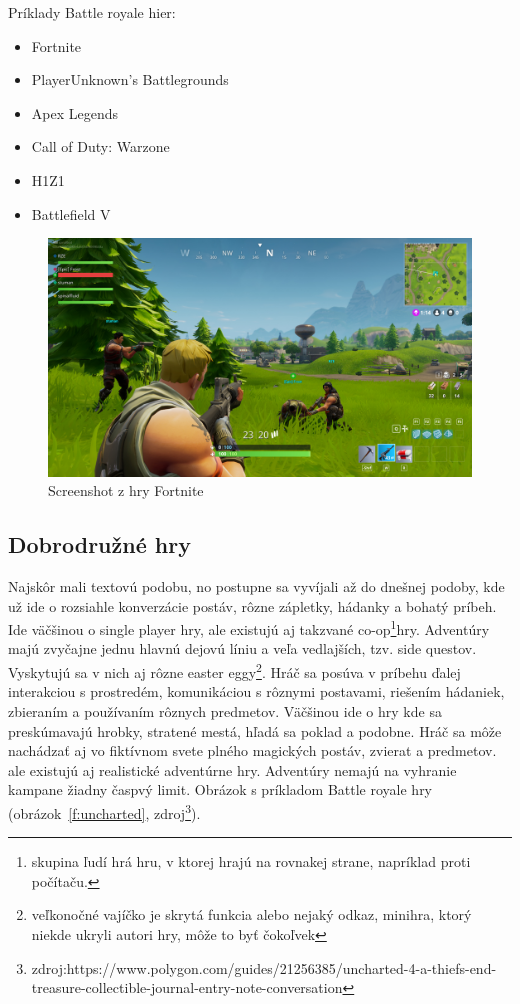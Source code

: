 \documentclass[10pt,oneside,slovak,a4paper]{article}
\begin{document}
Príklady Battle royale hier:
\begin{itemize}
\item Fortnite
\item PlayerUnknown's Battlegrounds
\item Apex Legends
\item Call of Duty: Warzone
\item H1Z1
\item Battlefield V
\end{itemize}

\begin{figure}[h]
\centering
\includegraphics[scale=0.10]{fortnite.jpg}
\caption{Screenshot z hry Fortnite}
\label{f:fortnite}
\end{figure}

\subsection{Dobrodružné hry} \label{zanre:adventure}

Najskôr mali textovú podobu, no postupne sa vyvíjali až do dnešnej podoby, kde už ide o rozsiahle konverzácie postáv, rôzne zápletky, hádanky a bohatý príbeh. Ide väčšinou o single player hry, ale existujú aj takzvané co-op\footnote{skupina ľudí hrá hru, v ktorej hrajú na rovnakej strane, napríklad proti počítaču.}hry. Adventúry majú zvyčajne jednu hlavnú dejovú líniu a veľa vedlajších, tzv. side questov. Vyskytujú sa v nich aj rôzne easter eggy\footnote{veľkonočné vajíčko je skrytá funkcia alebo nejaký odkaz, minihra, ktorý niekde ukryli autori hry, môže to byť čokoľvek }. Hráč sa posúva v príbehu ďalej interakciou s prostredém, komunikáciou s rôznymi postavami, riešením hádaniek, zbieraním a používaním rôznych predmetov. Väčšinou ide o hry kde sa preskúmavajú hrobky, stratené mestá, hľadá sa poklad a podobne. Hráč sa môže nachádzať aj vo fiktívnom svete plného magických postáv, zvierat a predmetov. ale existujú aj realistické adventúrne hry. Adventúry nemajú na vyhranie kampane žiadny časpvý limit. Obrázok s príkladom Battle royale hry (obrázok~\ref{f:uncharted}, zdroj\footnote{zdroj:https://www.polygon.com/guides/21256385/uncharted-4-a-thiefs-end-treasure-collectible-journal-entry-note-conversation}).
\end{document}
